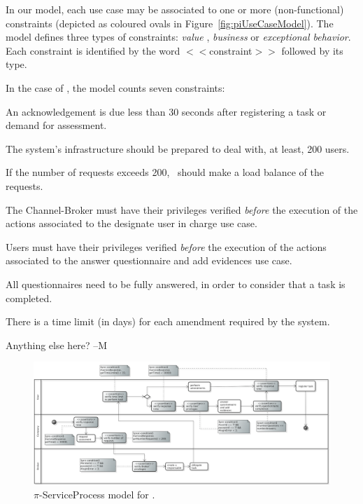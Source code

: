 In our model, each use case may be associated to one or more (non-functional) constraints (depicted as coloured ovals in Figure~\ref{fig:piUseCaseModel}). 
The model defines three types of constraints: \textit{value} , \textit{business} or \textit{exceptional behavior}. 
Each constraint is identified by the word $<<$\textsf{constraint}$>>$ followed by its type.

In the case of \FlyingPig, the model counts seven constraints:
\begin{numtrivlist}
\item An acknowledgement is due less than 30 seconds after registering a task or demand for assessment. 
\item The system's infrastructure should be prepared to deal with, at least, 200 users. 
\item If the number of requests exceeds 200, \FlyingPig\ should make a load balance of the requests. 
\item The Channel-Broker must have their privileges verified \textit{before} the execution of the actions associated to the \textsf{designate user in charge} use case.
\item Users must have their privileges verified \textit{before} the execution of the actions associated to the \textsf{answer questionnaire and add evidences} use case.
\item All questionnaires need to be fully answered, in order to consider that a task is completed.
\item There is a time limit (in days) for each amendment required by the system.
\end{numtrivlist}

{\color{red} Anything else here? --M}

\begin{figure}
\centering
\includegraphics[width=1.0\textwidth]{figs/ServiceProcessGeneralCut.png}
\caption{$\pi$-ServiceProcess model for \FlyingPig.\label{fig:PiServiceProcessModel}}
\end{figure}

